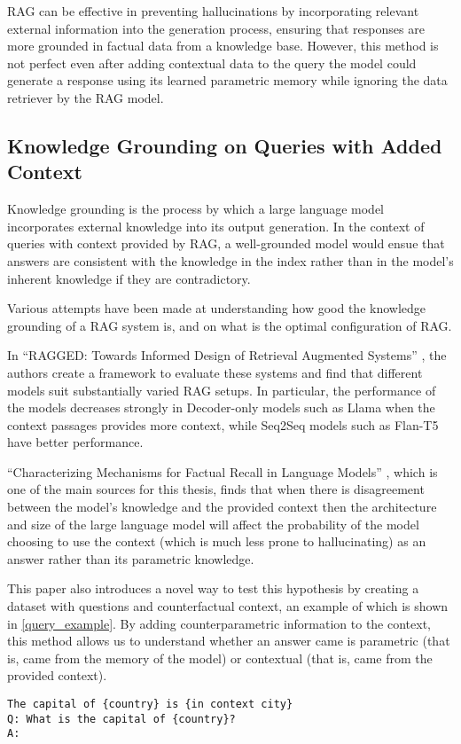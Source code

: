 RAG can be effective in preventing hallucinations by incorporating relevant external information into the generation process, ensuring that responses are more grounded in factual data from a knowledge base.
However, this method is not perfect even after adding contextual data to the query the model could generate a response using its learned parametric memory while ignoring the data retriever by the RAG model.

\subsection{Knowledge Grounding on Queries with Added Context}

Knowledge grounding is the process by which a large language model incorporates external knowledge into its output generation.
In the context of queries with context provided by RAG, a well-grounded model would ensue that answers are consistent with the knowledge in the index rather than in the model's inherent knowledge if they are contradictory.

Various attempts have been made at understanding how good the knowledge grounding of a RAG system is, and on what is the optimal configuration of RAG.

In ``RAGGED: Towards Informed Design of Retrieval Augmented Systems'' \citep{ragged}, the authors create a framework to evaluate these systems and find that different models suit substantially varied RAG setups.
In particular, the performance of the models decreases strongly in Decoder-only models such as Llama when the context passages provides more context, while Seq2Seq models such as Flan-T5 have better performance.

``Characterizing Mechanisms for Factual Recall in Language Models'' \citep{factual_recall}, which is one of the main sources for this thesis, finds that when there is disagreement between the model's knowledge and the provided context then the architecture and size of the large language model will affect the probability of the model choosing to use the context (which is much less prone to hallucinating) as an answer rather than its parametric knowledge.

This paper also introduces a novel way to test this hypothesis by creating a dataset with questions and counterfactual context, an example of which is shown in \cref{query_example}.
By adding counterparametric information to the context, this method allows us to understand whether an answer came is parametric (that is, came from the memory of the model) or contextual (that is, came from the provided context).

\begin{lstlisting}[caption={Example of queries used in \citep{factual_recall}. These queries form the basis and inspiration for the dataset creation done in this thesis}, label={query_example},basicstyle=\ttfamily\small,keywordstyle=\rmfamily\bfseries,keywords={country,in,context,city},captionpos=b,frame=single,breaklines=true,xrightmargin=.15\textwidth,xleftmargin=.15\textwidth,float=h]
The capital of {country} is {in context city}
Q: What is the capital of {country}?
A:
\end{lstlisting}
